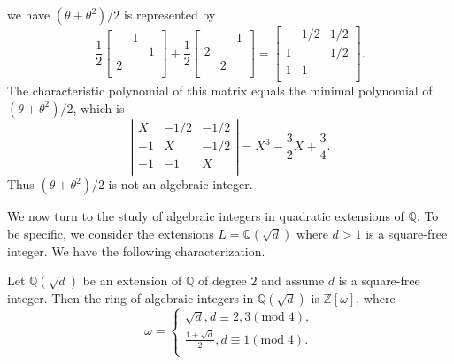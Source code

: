 we have $(\theta+\theta^2)/2$ is represented by 
$$
\frac{1}{2}\left[ \begin{matrix}
	&		1&		\\
	&		&		1\\
	2&		&		\\
\end{matrix} \right] +\frac{1}{2}\left[ \begin{matrix}
	&		&		1\\
	2&		&		\\
	&		2&		\\
\end{matrix} \right] =\left[ \begin{matrix}
	&		1/2&		1/2\\
	1&		&		1/2\\
	1&		1&		\\
\end{matrix} \right] .
$$
The characteristic polynomial of this matrix equals the minimal polynomial of $(\theta+\theta^2)/2$, which is 
$$
\left| \begin{matrix}
	X&		-1/2&		-1/2\\
	-1&		X&		-1/2\\
	-1&		-1&		X\\
\end{matrix} \right|=X^3-\frac{3}{2}X+\frac{3}{4}.
$$
Thus $(\theta+\theta^2)/2$ is not an algebraic integer.\par
We now turn to the study of algebraic integers in quadratic extensions of $\mathbb{Q}$. To be specific, we consider the extensions $L=\mathbb{Q}(\sqrt{d})$ where $d>1$ is a square-free integer. We have the following characterization.
\begin{theorem}
Let $\mathbb{Q}(\sqrt{d})$ be an extension of $\mathbb{Q}$ of degree $2$ and assume $d$ is a square-free integer. Then the ring of algebraic integers in $\mathbb{Q}(\sqrt{d})$ is $\mathbb{Z}[\omega]$, where 
$$
\omega =\begin{cases}
	\sqrt{d},d\equiv 2,3\left( \mathrm{mod}\;4 \right) ,\\
	\frac{1+\sqrt{d}}{2},d\equiv 1\left( \mathrm{mod}\;4 \right) .\\
\end{cases}
$$
\end{theorem}
